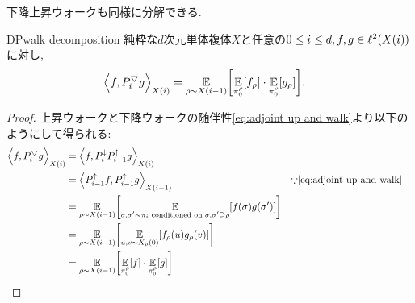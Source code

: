 下降上昇ウォークも同様に分解できる.
\begin{lemma}{}{DPwalk decomposition}
    純粋な$d$次元単体複体$X$と任意の$0\le i\le d,f,g\in \ispace$に対し,
    \begin{align*}
        \iprod{f,\PDU_i g}&= \E_{\rho\sim X(i-1)}\sbra*{ \E_{\pi^\rho_0}[f_\rho] \cdot \E_{\pi^\rho_0}[g_\rho] }.
    \end{align*}
\end{lemma}
\begin{proof}
上昇ウォークと下降ウォークの随伴性\cref{eq:adjoint up and walk}より以下のようにして得られる:
    \begin{align*}
        \iprod{f,\PDU_i g} &= \iprod{f,\Pdown_i \Pup_{i-1} g} \\
        &= \iprod[X(i-1)]{\Pup_{i-1}f, \Pup_{i-1}g } & & \text{$\because$\cref{eq:adjoint up and walk}} \\
        &= \E_{\rho \sim X(i-1)}\sbra*{ \E_{\substack{ \sigma,\sigma'\sim \pi_i\text{ conditioned on }\sigma,\sigma'\supseteq \rho }}\sbra*{f(\sigma)g(\sigma')} } \\
        &= \E_{\rho \sim X(i-1)}\sbra*{ \E_{u,v\sim X_\rho(0)}\sbra*{ f_\rho(u) g_\rho(v)} } \\
        &= \E_{\rho\sim X(i-1)}\sbra*{ \E_{\pi^\rho_0}[f]\cdot \E_{\pi^\rho_0}[g] }
    \end{align*}
\end{proof}

